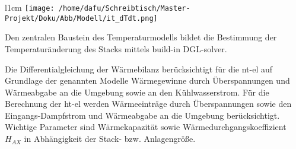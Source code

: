 \documentclass[onecolumn,10pt,titlepage]{article}
\begin{document}
\begin{wrapfigure}{l}{1cm}
	\texttt{[image: /home/dafu/Schreibtisch/Master-Projekt/Doku/Abb/Modell/it\_dTdt.png]}
\end{wrapfigure}
Den zentralen Baustein des Temperaturmodells bildet die Bestimmung der Temperaturänderung des Stacks mittels build-in DGL-solver. 

Die Differentialgleichung der Wärmebilanz berücksichtigt für die \gls{nt}-\gls{el} auf Grundlage der genannten Modelle Wärmegewinne durch Überspannungen und  Wärmeabgabe an die Umgebung sowie an den Kühlwasserstrom. Für die Berechnung der \gls{ht}-\gls{el} werden Wärmeeinträge durch Überspannungen sowie den Eingangs-Dampfstrom und  Wärmeabgabe an die Umgebung berücksichtigt.\\





Wichtige Parameter sind Wärmekapazität sowie Wärmedurchgangskoeffizient $H_{AX}$ in Abhängigkeit der Stack- bzw. Anlagengröße. 
\newline


%
\end{document}
